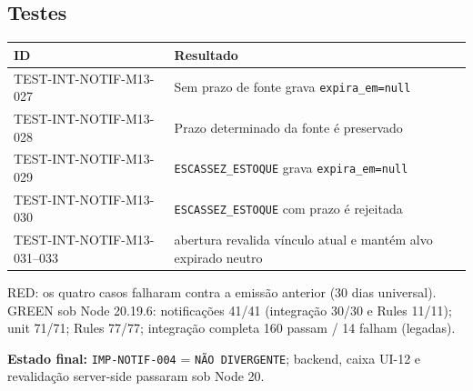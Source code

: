 \subsection{Testes}

\small
\begin{longtable}{@{}p{}p{}@{}}
\toprule
ID & Resultado \\
\midrule
\endhead
TEST-INT-NOTIF-M13-027 & Sem prazo de fonte grava \texttt{expira\_em=null} \\
TEST-INT-NOTIF-M13-028 & Prazo determinado da fonte é preservado \\
TEST-INT-NOTIF-M13-029 & \texttt{ESCASSEZ\_ESTOQUE} grava \texttt{expira\_em=null} \\
TEST-INT-NOTIF-M13-030 & \texttt{ESCASSEZ\_ESTOQUE} com prazo é rejeitada \\
TEST-INT-NOTIF-M13-031--033 & abertura revalida vínculo atual e mantém alvo expirado neutro \\
\bottomrule
\end{longtable}
\normalsize

RED: os quatro casos falharam contra a emissão anterior (30 dias universal).
GREEN sob Node 20.19.6: notificações 41/41 (integração 30/30 e Rules 11/11);
unit 71/71; Rules 77/77; integração completa 160 passam / 14 falham (legadas).

\textbf{Estado final:} \texttt{IMP-NOTIF-004} = \texttt{NÃO DIVERGENTE};
backend, caixa UI-12 e revalidação server-side passaram sob Node 20.
